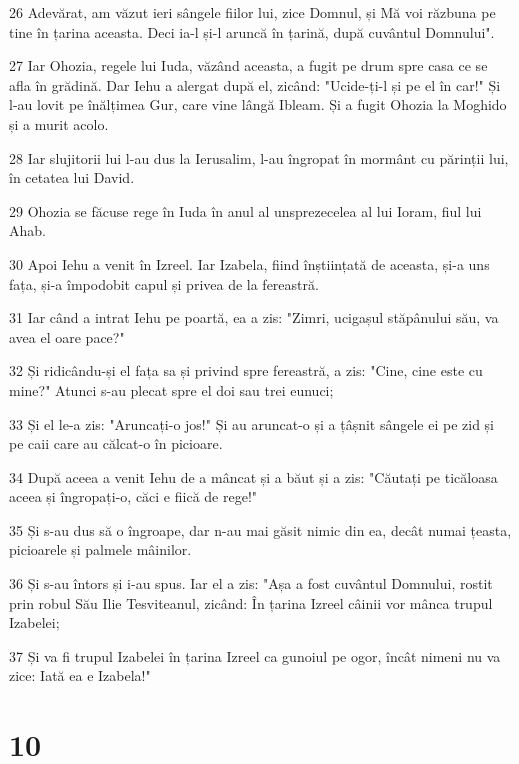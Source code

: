 \par 26 Adevărat, am văzut ieri sângele fiilor lui, zice Domnul, și Mă voi răzbuna pe tine în țarina aceasta. Deci ia-l și-l aruncă în țarină, după cuvântul Domnului".
\par 27 Iar Ohozia, regele lui Iuda, văzând aceasta, a fugit pe drum spre casa ce se afla în grădină. Dar Iehu a alergat după el, zicând: "Ucide-ți-l și pe el în car!" Și l-au lovit pe înălțimea Gur, care vine lângă Ibleam. Și a fugit Ohozia la Moghido și a murit acolo.
\par 28 Iar slujitorii lui l-au dus la Ierusalim, l-au îngropat în mormânt cu părinții lui, în cetatea lui David.
\par 29 Ohozia se făcuse rege în Iuda în anul al unsprezecelea al lui Ioram, fiul lui Ahab.
\par 30 Apoi Iehu a venit în Izreel. Iar Izabela, fiind înștiințată de aceasta, și-a uns fața, și-a împodobit capul și privea de la fereastră.
\par 31 Iar când a intrat Iehu pe poartă, ea a zis: "Zimri, ucigașul stăpânului său, va avea el oare pace?"
\par 32 Și ridicându-și el fața sa și privind spre fereastră, a zis: "Cine, cine este cu mine?" Atunci s-au plecat spre el doi sau trei eunuci;
\par 33 Și el le-a zis: "Aruncați-o jos!" Și au aruncat-o și a țâșnit sângele ei pe zid și pe caii care au călcat-o în picioare.
\par 34 După aceea a venit Iehu de a mâncat și a băut și a zis: "Căutați pe ticăloasa aceea și îngropați-o, căci e fiică de rege!"
\par 35 Și s-au dus să o îngroape, dar n-au mai găsit nimic din ea, decât numai țeasta, picioarele și palmele mâinilor.
\par 36 Și s-au întors și i-au spus. Iar el a zis: "Așa a fost cuvântul Domnului, rostit prin robul Său Ilie Tesviteanul, zicând: În țarina Izreel câinii vor mânca trupul Izabelei;
\par 37 Și va fi trupul Izabelei în țarina Izreel ca gunoiul pe ogor, încât nimeni nu va zice: Iată ea e Izabela!"

\chapter{10}

